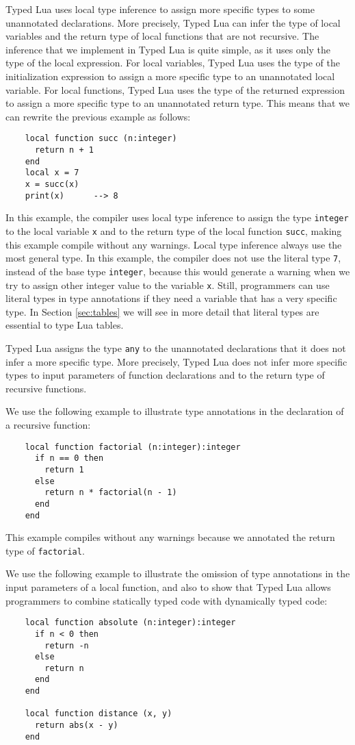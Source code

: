 Typed Lua uses local type inference to assign more specific types to
some unannotated declarations.
More precisely, Typed Lua can infer the type of local variables and
the return type of local functions that are not recursive.
The inference that we implement in Typed Lua is quite simple, as it
uses only the type of the local expression.
For local variables, Typed Lua uses the type of the initialization
expression to assign a more specific type to an unannotated local variable.
For local functions, Typed Lua uses the type of the returned expression
to assign a more specific type to an unannotated return type.
This means that we can rewrite the previous example as follows:
\begin{verbatim}
    local function succ (n:integer)
      return n + 1
    end
    local x = 7
    x = succ(x)
    print(x)      --> 8
\end{verbatim}

In this example, the compiler uses local type inference to assign the
type \texttt{integer} to the local variable \texttt{x} and to the
return type of the local function \texttt{succ}, making this example
compile without any warnings.
Local type inference always use the most general type.
In this example, the compiler does not use the literal type \texttt{7},
instead of the base type \texttt{integer}, because this would generate
a warning when we try to assign other integer value to the variable \texttt{x}.
Still, programmers can use literal types in type annotations if
they need a variable that has a very specific type.
In Section \ref{sec:tables} we will see in more detail that literal types
are essential to type Lua tables.

Typed Lua assigns the type \texttt{any} to the unannotated declarations
that it does not infer a more specific type.
More precisely, Typed Lua does not infer more specific types to input
parameters of function declarations and to the return type of
recursive functions.

We use the following example to illustrate type annotations in the
declaration of a recursive function:
\begin{verbatim}
    local function factorial (n:integer):integer
      if n == 0 then
        return 1
      else
        return n * factorial(n - 1)
      end
    end
\end{verbatim}

This example compiles without any warnings because we annotated
the return type of \texttt{factorial}.

We use the following example to illustrate the omission of type
annotations in the input parameters of a local function,
and also to show that Typed Lua allows programmers to combine
statically typed code with dynamically typed code:
\begin{verbatim}
    local function absolute (n:integer):integer
      if n < 0 then
        return -n
      else
        return n
      end
    end

    local function distance (x, y)
      return abs(x - y)
    end
\end{verbatim}

